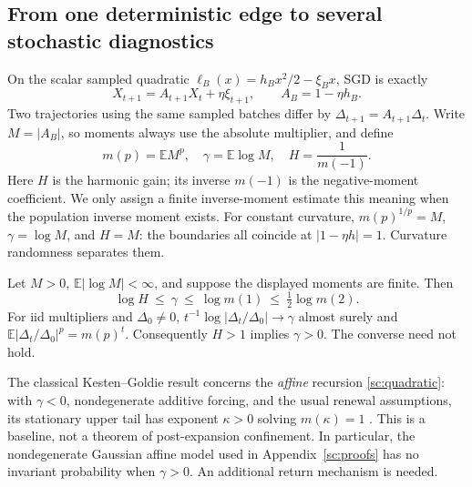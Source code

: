 
\subsection{From one deterministic edge to several stochastic diagnostics}
On the scalar sampled quadratic
\(\ell_B(x)=h_Bx^2/2-\xi_Bx\), SGD is exactly
\begin{equation}
 X_{t+1}=A_{t+1}X_t+\eta\xi_{t+1},\qquad A_B=1-\eta h_B.
 \label{sc:quadratic}
\end{equation}
Two trajectories using the same sampled batches differ by
\(\Delta_{t+1}=A_{t+1}\Delta_t\).
Write \(M=|A_B|\), so moments always use the absolute multiplier, and define
\begin{equation}
 m(p)=\mathbb E M^p,\quad
 \gamma=\mathbb E\log M,\quad
 H=\frac1{m(-1)}.
 \label{sc:diagnostics}
\end{equation}
Here \(H\) is the harmonic gain; its inverse \(m(-1)\) is the negative-moment
coefficient. We only assign a finite inverse-moment estimate this meaning
when the population inverse moment exists. For constant curvature,
\(m(p)^{1/p}=M\), \(\gamma=\log M\), and \(H=M\): the boundaries all
coincide at \(|1-\eta h|=1\). Curvature randomness separates them.

\begin{proposition}\label{sc:ordering}
Let \(M>0\), \(\mathbb E|\log M|<\infty\), and suppose the displayed moments
are finite. Then
\begin{equation}
 \log H\ \le\ \gamma\ \le\ \log m(1)\ \le\ \tfrac12\log m(2).
 \label{sc:ladder}
\end{equation}
For iid multipliers and \(\Delta_0\ne0\),
\(t^{-1}\log|\Delta_t/\Delta_0|\to\gamma\) almost surely and
\(\mathbb E|\Delta_t/\Delta_0|^p=m(p)^t\).
Consequently \(H>1\) implies \(\gamma>0\). The converse need not hold.
\end{proposition}

The classical Kesten--Goldie result concerns the \emph{affine} recursion
\eqref{sc:quadratic}: with \(\gamma<0\), nondegenerate additive forcing, and
the usual renewal assumptions, its stationary upper tail has exponent
\(\kappa>0\) solving \(m(\kappa)=1\)
\citep{kesten1973random,goldie1991implicit}.
This is a baseline, not a theorem of post-expansion confinement. In
particular, the nondegenerate Gaussian affine model used in
Appendix~\ref{sc:proofs} has no invariant probability when \(\gamma>0\).
An additional return mechanism is needed.

